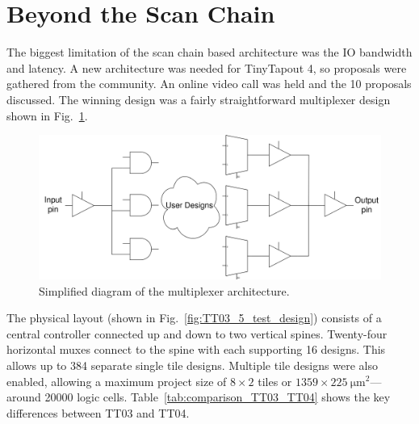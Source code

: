 \section{Beyond the Scan Chain}
\label{sec:beyond_scanchain}
The biggest limitation of the scan chain based architecture was the IO bandwidth and latency.
A new architecture was needed for TinyTapout 4, so proposals were gathered from the community.
An online video call was held and the 10 proposals discussed.
The winning design was a fairly straightforward multiplexer design shown in Fig.~\ref{fig:multiplexer_design}.

\begin{figure}[!t]
\centering
\includegraphics[width=\columnwidth]{./Figs/mux architecture.png}
\caption{Simplified diagram of the multiplexer architecture.}
\label{fig:multiplexer_design}
\end{figure}

The physical layout (shown in Fig.~\ref{fig:TT03_5_test_design}) consists of a central controller connected up and down to two vertical spines.
Twenty-four horizontal muxes connect to the spine with each supporting 16 designs.
This allows up to 384 separate single tile designs.
Multiple tile designs were also enabled, allowing a maximum project size of $8 \times 2$ tiles or $1359 \times \qty{225}{\um\squared}$---around \num{20000} logic cells. Table~\ref{tab:comparison_TT03_TT04} shows the key differences between TT03 and TT04.


